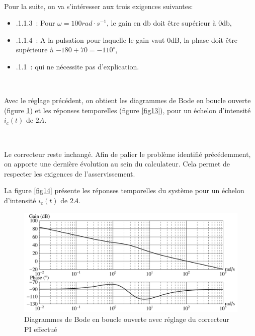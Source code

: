 ~\

Pour la suite, on va s'intéresser aux trois exigences suivantes:
\begin{itemize}
 \item {}.1.1.3\ \fg : Pour $\omega=100rad\cdot s^{-1}$, le gain en db doit être supérieur à 0db,
 \item {}.1.1.4\ \fg : A la pulsation pour laquelle le gain vaut 0dB, la phase doit être supérieure à $-180+70=-110^{\circ}$,
 \item {}.1.1\ \fg : qui ne nécessite pas d'explication.
\end{itemize}


~\

Avec le réglage précédent, on obtient les diagrammes de Bode en boucle ouverte (figure \ref{fig12}) et les
réponses temporelles (figure \ref{fig13}), pour un échelon d'intensité $i_c(t)$ de $2A$.


~\

Le correcteur reste inchangé. Afin de palier le problème identifié précédemment, on apporte une
dernière évolution au sein du calculateur. Cela permet de respecter les exigences de l'asservissement.

La figure \ref{fig14} présente les réponses temporelles du système pour un échelon d'intensité $i_c(t)$ de $2A$.


\begin{figure}[ht!]
 \begin{center}
 \includegraphics[width=.8\linewidth]{img/fig12}
 \caption{\label{fig12}Diagrammes de Bode en boucle ouverte avec réglage du correcteur PI effectué}
 \end{center}
\end{figure}

